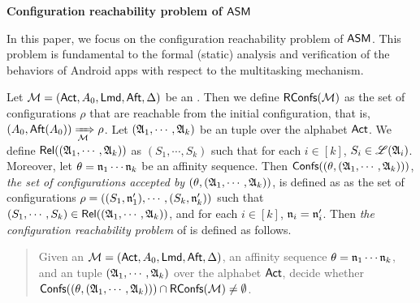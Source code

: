 	
	
	
	
	

\noindent\textbf{Configuration reachability problem of $\textsf{ASM}$} %

In this paper, we focus on the configuration reachability problem of $\textsf{ASM}$. This problem is fundamental to the formal (static) analysis and verification of the behaviors of Android apps with respect to the multitasking mechanism.  

Let ${\mathcal{M} } =({\sf Act}, A_0, {\sf Lmd}, {\sf Aft}, \Delta)$ be an  {\AMASS}. Then we define $\mathsf{RConfs}({\mathcal{M} })$ as the set of configurations $\rho$ that are reachable from the initial configuration, that is, 
$(A_0, {\sf Aft}(A_0)) \xRightarrow[{\mathcal{M} }]{} \rho$. 
Let $({\mathfrak{A} }_1,\cdots,{\mathfrak{A} }_k)$ be an {\NFA} tuple over the alphabet ${\sf Act}$. We define $\mathsf{Rel}(({\mathfrak{A} }_1, \cdots, {\mathfrak{A} }_k))$ as $(S_1, \cdots, S_k)$ such that for each $i \in [k]$, $S_i \in {\mathscr{L} }({\mathfrak{A} }_i)$. Moreover, let $\theta = \mathfrak{n}_1\cdots\mathfrak{n}_k$ be an affinity sequence. Then ${\mathsf{Confs} }((\theta, ({\mathfrak{A} }_1,\cdots,{\mathfrak{A} }_k)))$, \emph{the set of configurations accepted by $(\theta, ({\mathfrak{A} }_1,\cdots,{\mathfrak{A} }_k))$}, is defined as as the set of configurations $\rho = ((S_1,\mathfrak{n}'_1),\cdots,(S_k,\mathfrak{n}'_k))$  such that $(S_1, \cdots, S_k) \in \mathsf{Rel}(({\mathfrak{A} }_1, \cdots, {\mathfrak{A} }_k))$, and for each $i \in [k]$, $\mathfrak{n}_i=\mathfrak{n}_i'$.
%
Then \emph{the configuration reachability problem} of {\AMASS} is defined as follows. 
\begin{quote}
	Given an {\AMASS} ${\mathcal{M} }= ({\sf Act}, A_0, {\sf Lmd}, {\sf Aft}, \Delta)$, an affinity sequence $\theta = \mathfrak{n}_1\cdots\mathfrak{n}_k$, and an {\NFA} tuple $({\mathfrak{A} }_1,\cdots,{\mathfrak{A} }_k)$ over the alphabet ${\sf Act}$, decide whether $ {\mathsf{Confs} }({(\theta, ({\mathfrak{A} }_1,\cdots,{\mathfrak{A} }_k))}) \cap \mathsf{RConfs}({\mathcal{M} }) \neq \emptyset$.
\end{quote}

	

